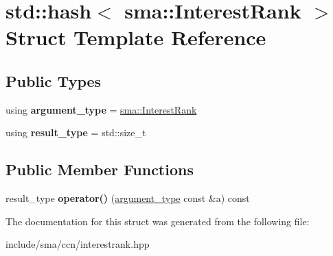 \hypertarget{structstd_1_1hash_3_01sma_1_1InterestRank_01_4}{\section{std\-:\-:hash$<$ sma\-:\-:Interest\-Rank $>$ Struct Template Reference}
\label{structstd_1_1hash_3_01sma_1_1InterestRank_01_4}
}
\subsection*{Public Types}
\begin{DoxyCompactItemize}
\item 
\hypertarget{structstd_1_1hash_3_01sma_1_1InterestRank_01_4_ad3b0657fad0aed6f46192ee5389e6644}{using {\bfseries argument\-\_\-type} = \hyperlink{structsma_1_1InterestRank}{sma\-::\-Interest\-Rank}}\label{structstd_1_1hash_3_01sma_1_1InterestRank_01_4_ad3b0657fad0aed6f46192ee5389e6644}

\item 
\hypertarget{structstd_1_1hash_3_01sma_1_1InterestRank_01_4_adfc72e7f6e7ac0bfb0ea5eecd132b027}{using {\bfseries result\-\_\-type} = std\-::size\-\_\-t}\label{structstd_1_1hash_3_01sma_1_1InterestRank_01_4_adfc72e7f6e7ac0bfb0ea5eecd132b027}

\end{DoxyCompactItemize}
\subsection*{Public Member Functions}
\begin{DoxyCompactItemize}
\item 
\hypertarget{structstd_1_1hash_3_01sma_1_1InterestRank_01_4_a07924b0cd58aa820678a516aaaa4efdc}{result\-\_\-type {\bfseries operator()} (\hyperlink{structsma_1_1InterestRank}{argument\-\_\-type} const \&a) const }\label{structstd_1_1hash_3_01sma_1_1InterestRank_01_4_a07924b0cd58aa820678a516aaaa4efdc}

\end{DoxyCompactItemize}


The documentation for this struct was generated from the following file\-:\begin{DoxyCompactItemize}
\item 
include/sma/ccn/interestrank.\-hpp\end{DoxyCompactItemize}
